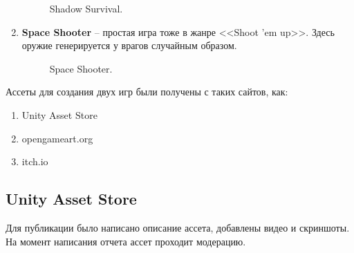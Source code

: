 \begin{enumerate}[label=\textbullet]
\begin{figure}[ht]
\begin{center}
            \caption{
                \label{ShadowSurvival}
                Shadow Survival.
            }
        \end {center}
    \end {figure}

    \item \textbf{Space Shooter} -- простая игра тоже в жанре <<Shoot ’em up>>. Здесь оружие генерируется у врагов случайным образом.

    \begin{figure}[ht]
        \begin{center}

            \caption{
                \label{SpaceShooter}
                Space Shooter.
            }
        \end {center}
    \end {figure}


\end{enumerate}

Ассеты для создания двух игр были получены с таких сайтов, как:
\begin{enumerate}
    \item Unity Asset Store\cite{s4}
    \item opengameart.org\cite{s5}
    \item itch.io\cite{s6}
\end{enumerate}

\pagebreak


\subsection{Unity Asset Store}

Для публикации было написано описание ассета, добавлены видео и скриншоты. На момент написания отчета ассет проходит модерацию.

